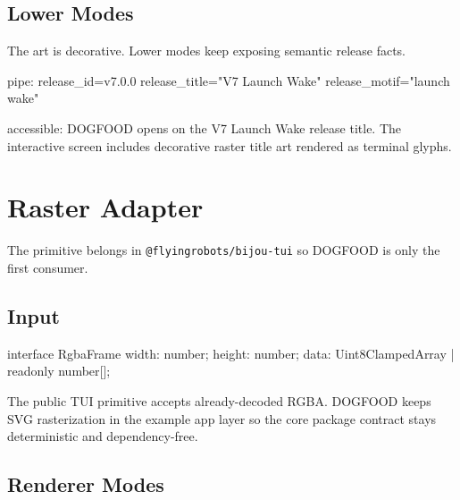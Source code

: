 \subsection{Lower Modes}\label{record-113-lower-modes}

The art is decorative. Lower modes keep exposing semantic release facts.

\begin{CodeBlock}
pipe:
  release_id=v7.0.0
  release_title="V7 Launch Wake"
  release_motif="launch wake"

accessible:
  DOGFOOD opens on the V7 Launch Wake release title. The interactive
  screen includes decorative raster title art rendered as terminal glyphs.
\end{CodeBlock}

\section{Raster Adapter}\label{record-113-raster-adapter}

The primitive belongs in \texttt{@\allowbreak{}f\allowbreak{}l\allowbreak{}y\allowbreak{}i\allowbreak{}n\allowbreak{}g\allowbreak{}r\allowbreak{}o\allowbreak{}b\allowbreak{}o\allowbreak{}t\allowbreak{}s\allowbreak{}/\allowbreak{}b\allowbreak{}i\allowbreak{}j\allowbreak{}o\allowbreak{}u\allowbreak{}-\allowbreak{}t\allowbreak{}u\allowbreak{}i} so DOGFOOD is only the first consumer.



\subsection{Input}\label{record-113-input}

\begin{CodeBlock}
interface RgbaFrame {
  width: number;
  height: number;
  data: Uint8ClampedArray | readonly number[];
}
\end{CodeBlock}

The public TUI primitive accepts already-decoded RGBA. DOGFOOD keeps SVG rasterization in the example app layer so the core package contract stays deterministic and dependency-free.

\subsection{Renderer Modes}\label{record-113-renderer-modes}

